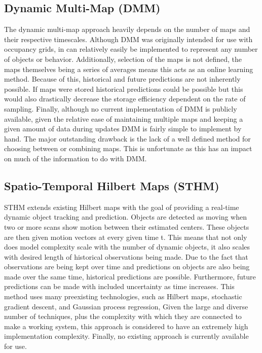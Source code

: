   \subsection { Dynamic Multi-Map (DMM) }
  The dynamic multi-map approach heavily depends on the number of maps and their
  respective timescales. Although DMM was originally intended for use with
  occupancy grids, in can relatively easily be implemented to represent any
  number of objects or behavior. Additionally, selection of the maps is not
  defined, the maps themselves being a series of averages means this acts as
  an online learning method. Because of this, historical and future predictions
  are not inherently possible. If maps were stored historical predictions
  could be possible but this would also drastically decrease the storage
  efficiency dependent on the rate of sampling. Finally, although no current
  implementation of DMM is publicly available, given the relative ease of
  maintaining multiple maps and keeping a given amount of data during updates
  DMM is fairly simple to implement by hand. The major outstanding drawback
  is the lack of a well defined method for choosing between or combining maps.
  This is unfortunate as this has an impact on much of the information to do
  with DMM.

  \subsection{ Spatio-Temporal Hilbert Maps (STHM) }
  STHM extends existing Hilbert maps with the goal of providing a real-time
  dynamic object tracking and prediction. Objects are detected as moving when
  two or more scans show motion between their estimated centers. These objects
  are then given motion vectors at every given time t. This means that not
  only does model complexity scale with the number of dynamic objects, it also
  scales with desired length of historical observations being made. Due to the
  fact that observations are being kept over time and predictions on objects
  are also being made over the same time, historical predictions are possible.
  Furthermore, future predictions can be made with included uncertainty as
  time increases. This method uses many preexisting technologies, such
  as Hilbert maps, stochastic gradient descent, and Gaussian process regression,
  Given the large and diverse number of techniques, plus the complexity with
  which they are connected to make a working system, this approach is considered
  to have an extremely high implementation complexity. Finally, no existing
  approach is currently available for use.

